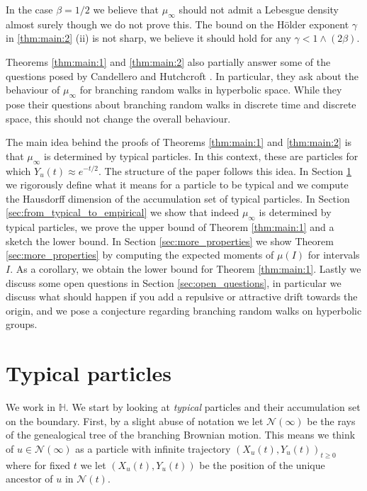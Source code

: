 \documentclass{article}
\theoremstyle{definition}
\numberwithin{equation}{section}
\numberwithin{thm}{section}
\newcommand*{\eps}{\ensuremath{\varepsilon}}            %
\newcommand*{\HH}{\ensuremath{\mathbb{H}}}	        	%
\begin{document}
In the case $\beta =1/2$ we believe that $\mu_\infty$ should not admit a Lebesgue density almost surely though we do not prove this. 
The bound on the Hölder exponent $\gamma$ in \ref{thm:main:2} (ii) is not sharp, we believe it should hold for any $\gamma < 1 \wedge (2\beta)$.

Theorems \ref{thm:main:1} and \ref{thm:main:2} also partially answer some of the questions posed by Candellero and Hutchcroft \cite[Problems 4.2, 4.3]{candellero_boundary_2023}. In particular, they ask about the behaviour of $\mu_\infty$ for branching random walks in hyperbolic space. While they pose their questions about branching random walks in discrete time and discrete space, this should not change the overall behaviour. 

The main idea behind the proofs of Theorems \ref{thm:main:1} and \ref{thm:main:2} is that $\mu_\infty$ is determined by typical particles. In this context{,} these are particles {for which} $Y_u(t)\approx e^{-t/2}$. The structure of the paper follows this idea. In Section \ref{sec:typical_particles} we rigorously define what it means for a particle to be typical and we compute the Hausdorff dimension of the accumulation set of typical particles. In Section \ref{sec:from_typical_to_empirical} we show that indeed $\mu_\infty$ is determined by typical particles, we prove the upper bound of Theorem \ref{thm:main:1} and a sketch the lower bound. In Section \ref{sec:more_properties} we show Theorem \ref{sec:more_properties} by computing the expected moments of $\mu(I)$ for intervals $I$. As a corollary, we obtain the lower bound for Theorem \ref{thm:main:1}. Lastly we discuss some open questions in Section \ref{sec:open_questions}, in particular we discuss what should happen if you {add} a repulsive or attractive drift towards the origin, and we pose a conjecture regarding branching random walks on hyperbolic groups. 

\section{Typical particles}\label{sec:typical_particles}

We work in $\HH$.
We start by looking at \emph{typical} particles and their accumulation set on the boundary.
First, by a slight abuse of notation we let $\mathcal{N}(\infty)$ be the rays of the genealogical tree of the branching Brownian motion. This means we think of $u\in \mathcal{N}(\infty)$ as a particle with infinite trajectory $(X_u(t),Y_u(t))_{t \geq 0}$ where for fixed $t$ we let $(X_u(t),Y_u(t))$ be the position of the unique ancestor of $u$ in $\mathcal{N}(t)$. 
\end{document}
